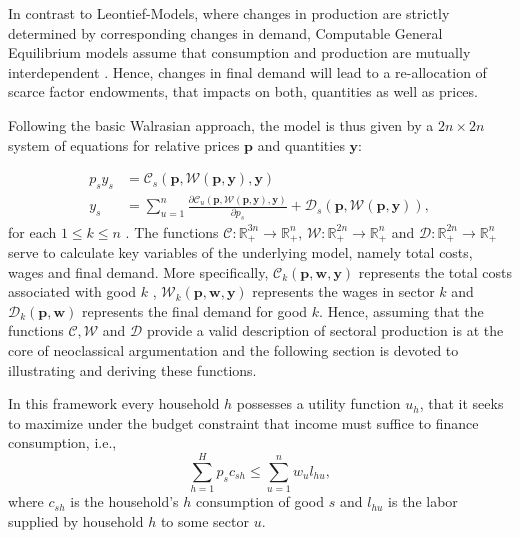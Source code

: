\documentclass{article}
\newcommand{\costf}{\mathscr{C}}
\newcommand{\prices}{\mathbf{p}}
\newcommand{\quant}{\mathbf{y}}
\newcommand{\wages}{\mathbf{w}}
\newcommand{\wagef}{\mathscr{W}}
\newcommand{\demandf}{\mathscr{D}}
\begin{document}
In contrast to Leontief-Models, where changes in production are strictly determined by corresponding changes in demand, Computable General Equilibrium models assume that consumption and production are mutually interdependent \citep[see][for a general introduction]{cardeneteAppliedGeneralEquilibrium2017}.
Hence, changes in final demand will lead to a re-allocation of scarce factor endowments, that impacts on both, quantities as well as prices.

Following the basic Walrasian approach, the model is thus given by a $2n \times 2n$ system of equations for relative prices $\mathbf{p}$ and quantities $\mathbf{y}$: 

\begin{align}
\label{eq:equilibrium}
  p_s y_s &= \costf_s (\prices,\wagef(\prices,\quant), \quant) \\
 y_s &=  \sum_{u=1}^n \frac{\partial \costf_u (\prices,\wagef(\prices,\quant),\quant)}{\partial p_s} + \demandf_s(\prices,\mathscr W(\prices,\quant)),
\end{align}
for each $1 \leq  k \leq n$ .
The functions $\mathscr{C} \colon \mathbb R^{3n}_+ \to \mathbb R^n_+,\, \mathscr{W}: \mathbb R^{2n}_+ \to \mathbb R^n_+$ and $\mathscr{D}: \mathbb R^{2n}_+ \to \mathbb R^n_+$ serve to calculate key variables of the underlying model, namely total costs, wages and final demand. More specifically, $\costf_k(\prices,\wages,\quant)$ represents the total costs associated with good $k$ ,
$\wagef_k(\prices,\wages,\quant)$ represents the wages in sector $k$
and $\demandf_k(\prices,\wages)$ represents the final demand for good $k$. Hence, assuming that the functions $\costf, \wagef$ and $\demandf$ provide a valid description of sectoral production is at the core of neoclassical argumentation and the following section is devoted to illustrating and deriving these functions.

In this framework every household $h$ possesses a utility function $u_h$, that it seeks to maximize under the budget constraint that income must suffice to finance consumption, i.e.,
\begin{equation}
  \sum_{h = 1}^H p_s c_{sh} \leq \sum_{u=1}^n w_{u} l_{hu},
\end{equation}
where $c_{sh}$ is the household's $h$ consumption of good $s$ and $l_{hu}$ is the labor supplied by household $h$ to some sector $u$.
\end{document}
